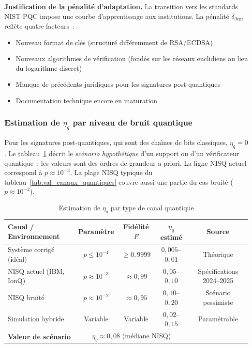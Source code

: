 \begin{sloppypar}
\noindent\textbf{Justification de la p\'enalit\'e d'adaptation.} La transition
vers les standards NIST PQC impose une courbe d'apprentissage aux institutions.
La p\'enalit\'e $\delta_{\text{degr}}$ refl\`ete quatre facteurs~:
\begin{itemize}
\item Nouveau format de cl\'es (structur\'e diff\'eremment de RSA/ECDSA)
\item Nouveaux algorithmes de v\'erification (fond\'es sur les r\'eseaux euclidiens au lieu du logarithme discret)
\item Manque de pr\'ec\'edents juridiques pour les signatures post-quantiques
\item Documentation technique encore en maturation
\end{itemize}

\subsubsection{Estimation de $\eta_q$ par niveau de bruit quantique}
\label{subsec:estimation_eta_q}

Pour les signatures post-quantiques, qui sont des cha\^{\i}nes de bits
classiques, $\eta_q = 0$. Le tableau~\ref{tab:estimation_eta_q} d\'ecrit le
\emph{sc\'enario hypoth\'etique} d'un support ou d'un v\'erificateur quantique~;
les valeurs sont des ordres de grandeur a priori. La ligne \og NISQ actuel\fg{} correspond \`a $p \approx 10^{-3}$. La plage \og NISQ typique\fg{} du tableau~\ref{tab:val_canaux_quantiques} couvre aussi une partie du cas bruit\'e ($p \approx 10^{-2}$).

\begin{table}[htbp]
\centering
\caption{Estimation de $\eta_q$ par type de canal quantique}
\label{tab:estimation_eta_q}
\begin{tabular}{@{}lcccc@{}}
\toprule
\textbf{Canal / Environnement} & \textbf{Param\`etre} & \textbf{Fid\'elit\'e $F$} &
$\eta_q$ \textbf{estim\'e} & \textbf{Source} \\
\midrule
Syst\`eme corrig\'e (id\'eal) & $p \leq 10^{-4}$ & $\geq 0{,}9999$ & $0{,}005$--$0{,}01$ & Th\'eorique \\
NISQ actuel (IBM, IonQ) & $p \approx 10^{-3}$ & $\approx 0{,}99$ & $0{,}05$--$0{,}10$ & Sp\'ecifications 2024--2025 \\
NISQ bruit\'e & $p \approx 10^{-2}$ & $\approx 0{,}95$ & $0{,}10$--$0{,}20$ & Sc\'enario pessimiste \\
Simulation hybride & Variable & Variable & $0{,}02$--$0{,}15$ & Param\'etrable \\
\midrule
\textbf{Valeur de sc\'enario} & \multicolumn{3}{c}{$\eta_q \approx 0{,}08$ (m\'ediane NISQ)} & \cite{MINKA2026PQCRO} \\
\bottomrule
\end{tabular}
\end{table}


\end{sloppypar}
